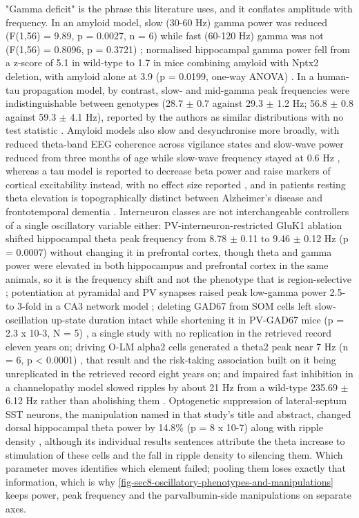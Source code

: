 \documentclass[11pt]{article}
\begin{document}
"Gamma deficit" is the phrase this literature uses, and it conflates amplitude with frequency. In an amyloid model, slow (30-60 Hz) gamma power was reduced (F(1,56) = 9.89, p = 0.0027, n = 6) while fast (60-120 Hz) gamma was not (F(1,56) = 0.8096, p = 0.3721) \citep{Etter2019}; normalised hippocampal gamma power fell from a z-score of 5.1 in wild-type to 1.7 in mice combining amyloid with Nptx2 deletion, with amyloid alone at 3.9 (p = 0.0199, one-way ANOVA) \citep{Xiao2017}. In a human-tau propagation model, by contrast, slow- and mid-gamma peak frequencies were indistinguishable between genotypes (28.7 $\pm$ 0.7 against 29.3 $\pm$ 1.2 Hz; 56.8 $\pm$ 0.8 against 59.3 $\pm$ 4.1 Hz), reported by the authors as similar distributions with no test statistic \citep{Viney2022}. Amyloid models also slow and desynchronise more broadly, with reduced theta-band EEG coherence across vigilance states \citep{Constantino2026} and slow-wave power reduced from three months of age while slow-wave frequency stayed at 0.6 Hz \citep{Lee2023a}, whereas a tau model is reported to decrease beta power and raise markers of cortical excitability instead, with no effect size reported \citep{Irmen2026}, and in patients resting theta elevation is topographically distinct between Alzheimer's disease and frontotemporal dementia \citep{Cai2026}. Interneuron classes are not interchangeable controllers of a single oscillatory variable either: PV-interneuron-restricted GluK1 ablation shifted hippocampal theta peak frequency from 8.78 $\pm$ 0.11 to 9.46 $\pm$ 0.12 Hz (p = 0.0007) without changing it in prefrontal cortex, though theta and gamma power were elevated in both hippocampus and prefrontal cortex in the same animals, so it is the frequency shift and not the phenotype that is region-selective \citep{Rhee2026}; potentiation at pyramidal and PV synapses raised peak low-gamma power 2.5- to 3-fold in a CA3 network model \citep{Hadler2024}; deleting GAD67 from SOM cells left slow-oscillation up-state duration intact while shortening it in PV-GAD67 mice (p = 2.3 x 10-3, N = 5) \citep{Kuki2015}, a single study with no replication in the retrieved record eleven years on; driving O-LM alpha2 cells generated a theta2 peak near 7 Hz (n = 6, p < 0.0001) \citep{Mikulovic2018}, that result and the risk-taking association built on it being unreplicated in the retrieved record eight years on; and impaired fast inhibition in a channelopathy model slowed ripples by about 21 Hz from a wild-type 235.69 $\pm$ 6.12 Hz rather than abolishing them \citep{Lascorz2026}. Optogenetic suppression of lateral-septum SST neurons, the manipulation named in that study's title and abstract, changed dorsal hippocampal theta power by 14.8\% (p = 8 x 10-7) along with ripple density \citep{Espinosa2022}, although its individual results sentences attribute the theta increase to stimulation of these cells and the fall in ripple density to silencing them. Which parameter moves identifies which element failed; pooling them loses exactly that information, which is why \ref{fig-sec8-oscillatory-phenotypes-and-manipulations} keeps power, peak frequency and the parvalbumin-side manipulations on separate axes.
\end{document}
